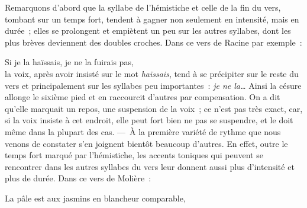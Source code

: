 \documentclass[french,twoside]{book} %
\begin{document}
Remarquons d’abord que la syllabe de l’hémistiche et celle de la fin du vers, tombant sur un temps fort, tendent à gagner non seulement en intensité, mais en durée ; elles se prolongent et empiètent un peu sur les autres syllabes, dont les plus brèves deviennent des doubles croches. Dans ce vers de Racine par exemple :\par

Si je la haïssais, je ne la fuirais pas,\\

\noindent la voix, après avoir insisté sur le mot \emph{haïssais}, tend à se précipiter sur le reste du vers et principalement sur les  syllabes peu importantes : \emph{je ne la…} Ainsi la césure allonge le sixième pied et en raccourcit d’autres par compensation. On a dit qu’elle marquait un repos, une suspension de la voix ; ce n’est pas très exact, car, si la voix insiste à cet endroit, elle peut fort bien ne pas se suspendre, et le doit même dans la plupart des cas. — À la première variété de rythme que nous venons de constater s’en joignent bientôt beaucoup d’autres. En effet, outre le temps fort marqué par l’hémistiche, les accents toniques qui peuvent se rencontrer dans les autres syllabes du vers leur donnent aussi plus d’intensité et plus de durée. Dans ce vers de Molière :\par

La pâle est aux jasmins en blancheur comparable,\\
\end{document}
